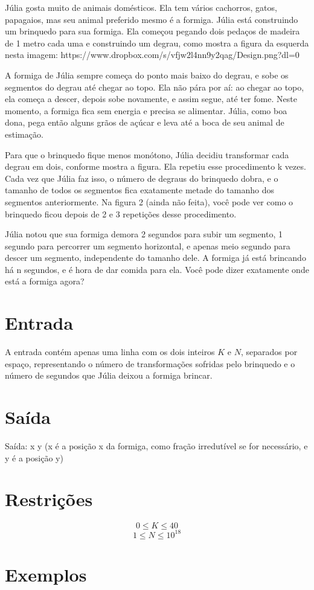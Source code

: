 Júlia gosta muito de animais domésticos. Ela tem vários cachorros, gatos, papagaios, mas seu animal preferido mesmo é a formiga. Júlia está construindo um brinquedo para sua formiga. Ela começou pegando dois pedaços de madeira de 1 metro cada uma e construindo um degrau, como mostra a figura da esquerda nesta imagem: https://www.dropbox.com/s/vfjw2l4nn9y2qag/Design.png?dl=0

A formiga de Júlia sempre começa do ponto mais baixo do degrau, e sobe os segmentos do degrau até chegar ao topo. Ela não pára por aí: ao chegar ao topo, ela começa a descer, depois sobe novamente, e assim segue, até ter fome. Neste momento, a formiga fica sem energia e precisa se alimentar. Júlia, como boa dona, pega então alguns grãos de açúcar e leva até a boca de seu animal de estimação.

Para que o brinquedo fique menos monótono, Júlia decidiu transformar cada degrau em dois, conforme mostra a figura. Ela repetiu esse procedimento k vezes. Cada vez que Júlia faz isso, o número de degraus do brinquedo dobra, e o tamanho de todos os segmentos fica exatamente metade do tamanho dos segmentos anteriormente. Na figura 2 (ainda não feita), você pode ver como o brinquedo ficou depois de 2 e 3 repetições desse procedimento.

Júlia notou que sua formiga demora 2 segundos para subir um segmento, 1 segundo para percorrer um segmento horizontal, e apenas meio segundo para descer um segmento, independente do tamanho dele. A formiga já está brincando há n segundos, e é hora de dar comida para ela. Você pode dizer exatamente onde está a formiga agora?

\section*{Entrada}

A entrada contém apenas uma linha com os dois inteiros $K$ e $N$, separados por espaço, representando o número de transformações sofridas pelo brinquedo e o número de segundos que Júlia deixou a formiga brincar.

\section*{Saída}

Saída: x y (x é a posição x da formiga, como fração irredutível se for necessário, e y é a posição y)

\section*{Restrições}

$$0 \leq K \leq 40$$
$$1 \leq N \leq 10^{18}$$

\section*{Exemplos}
\exemplo
